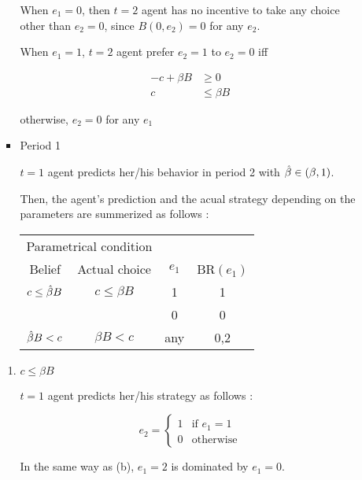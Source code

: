 \documentclass{jsarticle}
\begin{document}
\begin{enumerate}
\begin{enumerate}
\begin{itemize}
 When $e_1=0$, then $t=2$ agent has no incentive to take any choice other than $e_2=0$, since $B(0,e_2)=0$ for any $e_2$.
 
 When $e_1=1$, $t=2$ agent prefer $e_2=1$ to $e_2=0$ iff
 
 \begin{align*}
 - c + \beta B &\geq 0 \\
 c & \leq \beta B
 \end{align*}
 
 otherwise, $e_2=0$ for any $e_1$
 
 \item Period 1
 
 $t=1$ agent predicts her/his behavior in period 2 with $\Hat{\beta} \in (\beta, 1)$.
 
 Then, the agent's prediction and the acual strategy depending on the parameters are summerized as follows :
 
  \begin{center}
  
  \begin{tabular}{cccc} \hline
 \multicolumn{2}{c}{Parametrical condition} & & \\
 \multicolumn{1}{c}{Belief} & \multicolumn{1}{c}{Actual choice} & $e_1$ & BR$(e_1)$ \\ \hline
 $c \leq \Hat{\beta}B$ & $c \leq \beta B$ & 1 & 1 \\
  & & 0 & 0 \\
 $\Hat{\beta} B < c $ & $\beta B <c$ & any & 0,2 \\ \hline
  \end{tabular}
  
  \end{center}
  
  \vspace{1zw}
 
 \end{itemize}

 \begin{enumerate}
 
 \item $c \leq \beta B$
 
 $t=1$ agent predicts her/his strategy as follows :
 
 \[e_2 = \begin{cases}
 1 & \text{if } e_1=1 \\
 0 & \text{otherwise}
 \end{cases} \]
 
 In the same way as (b), $e_1=2$ is dominated by $e_1=0$.
 

\end{enumerate}
\end{enumerate}
\end{enumerate}
\end{document}
